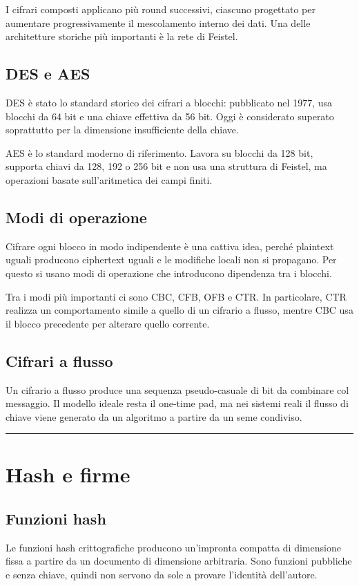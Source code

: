 \documentclass[12pt, a4paper]{report}
\begin{document}
I cifrari composti applicano più round successivi, ciascuno progettato per aumentare progressivamente il mescolamento interno dei dati. Una delle architetture storiche più importanti è la rete di Feistel.

\subsection{DES e AES}
DES è stato lo standard storico dei cifrari a blocchi: pubblicato nel 1977, usa blocchi da 64 bit e una chiave effettiva da 56 bit. Oggi è considerato superato soprattutto per la dimensione insufficiente della chiave.

AES è lo standard moderno di riferimento. Lavora su blocchi da 128 bit, supporta chiavi da 128, 192 o 256 bit e non usa una struttura di Feistel, ma operazioni basate sull'aritmetica dei campi finiti.

\subsection{Modi di operazione}
Cifrare ogni blocco in modo indipendente è una cattiva idea, perché plaintext uguali producono ciphertext uguali e le modifiche locali non si propagano. Per questo si usano modi di operazione che introducono dipendenza tra i blocchi.

Tra i modi più importanti ci sono CBC, CFB, OFB e CTR. In particolare, CTR realizza un comportamento simile a quello di un cifrario a flusso, mentre CBC usa il blocco precedente per alterare quello corrente.

\subsection{Cifrari a flusso}
Un cifrario a flusso produce una sequenza pseudo-casuale di bit da combinare col messaggio. Il modello ideale resta il one-time pad, ma nei sistemi reali il flusso di chiave viene generato da un algoritmo a partire da un seme condiviso.

\noindent\rule{\textwidth}{0.4pt}

\section{Hash e firme}

\subsection{Funzioni hash}
Le funzioni hash crittografiche producono un'impronta compatta di dimensione fissa a partire da un documento di dimensione arbitraria. Sono funzioni pubbliche e senza chiave, quindi non servono da sole a provare l'identità dell'autore.
\end{document}
